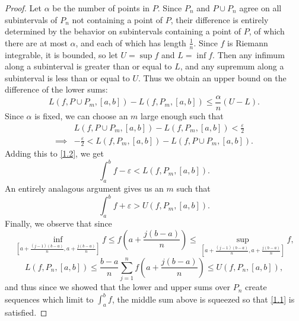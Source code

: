 \documentclass[12pt]{article}
\theoremstyle{definition}
\begin{document}
\begin{proof}
  Let $\alpha$ be the number of points in $P$.
  Since $P_n$ and $P \cup P_n$ agree on all subintervals of $P_n$ not containing a point of $P$, their difference is entirely determined by the behavior on subintervals containing a point of $P$, of which there are at most $\alpha$, and each of which has length $\frac{1}{n}$.
  Since $f$ is Riemann integrable, it is bounded, so let $U = \sup f$ and $L = \inf f$.
  Then any infimum along a subinterval is greater than or equal to $L$, and any supremum along a subinterval is less than or equal to $U$.
  Thus we obtain an upper bound on the difference of the lower sums: \begin{equation*}
    L(f, P \cup P_m, [a,b]) - L(f, P_m, [a,b]) \leq \frac{\alpha}{n}(U - L).
  \end{equation*}
  Since $\alpha$ is fixed, we can choose an $m$ large enough such that \begin{align*}
		         & L(f, P \cup P_m, [a, b]) - L(f, P_m, [a, b]) < \frac{\varepsilon}{2}  \\
		\implies & - \frac{\varepsilon}{2} < L(f, P_m, [a, b]) - L(f, P \cup P_m, [a, b]).
	\end{align*}
	Adding this to \eqref{1.2}, we get \begin{equation*}
		\int_a^b f - \varepsilon < L(f, P_m, [a, b]).
	\end{equation*}
	An entirely analagous argument gives us an $m$ such that \begin{equation*}
		\int_a^b f + \varepsilon > U(f, P_m, [a, b]).
	\end{equation*}
	Finally, we observe that since \begin{equation*}
		\inf_{\left[a + \frac{(j-1)(b-a)}{n}, a + \frac{j(b-a)}{n}\right]} f \leq f \left( a + \frac{j(b-a)}{n} \right) \leq \sup_{\left[ a + \frac{(j-1)(b-a)}{n}, a + \frac{j(b-a)}{n} \right]} f,
	\end{equation*}
	\begin{equation*}
		L(f, P_n, [a, b]) \leq \frac{b-a}{n} \sum_{j=1}^n f \left( a + \frac{j(b-a)}{n} \right) \leq U(f, P_n, [a,b]),
	\end{equation*}
	and thus since we showed that the lower and upper sums over $P_n$ create sequences which limit to $\int_a^b f$, the middle sum above is squeezed so that \eqref{1.1} is satisfied.
\end{proof}
\end{document}
